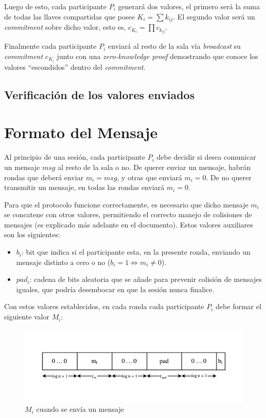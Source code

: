 Luego de esto, cada participante $P_i$ generará dos valores, el primero será 
la suma de todas las llaves compartidas que posee $K_i = \sum k_{ij}$. El 
segundo valor será un \emph{commitment} sobre dicho valor, esto es, 
$c_{K_i} = \prod c_{k_{ij}}$.

Finalmente cada participante $P_i$ enviará al resto de la sala vía 
\emph{broadcast} su \emph{commitment} $c_{K_i}$ junto con una 
\emph{zero-knowledge proof} demostrando que conoce los valores ``escondidos'' 
dentro del \emph{commitment}.

\subsection{Verificación de los valores enviados}


\section{Formato del Mensaje}

Al principio de una sesión, cada participante $P_i$ debe decidir si desea comunicar 
un mensaje $msg$ al resto de la sala o no. De querer enviar un mensaje, habrán 
rondas que deberá enviar $m_i = msg$, y otras que enviará $m_i = 0$. De no querer 
transmitir un mensaje, en todas las rondas enviará $m_i = 0$. 

Para que el protocolo funcione correctamente, es necesario que dicho mensaje $m_i$ 
se concatene con otros valores, permitiendo el correcto manejo de colisiones de 
mensajes (es explicado más adelante en el documento). Estos valores auxiliares son 
los siguientes:
\begin{itemize}
    \item $b_i$: bit que indica si el participante esta, en la presente ronda, 
    enviando un mensaje distinto a cero o no ($b_i = 1 \iff m_i \neq 0$).
    \item $pad_i$: cadena de bits aleatoria que se añade para prevenir colisión 
    de mensajes iguales, que podría desembocar en que la sesión nunca finalice.
\end{itemize}

Con estos valores establecidos, en cada ronda cada participante $P_i$ debe formar 
el siguiente valor $M_i$:

\begin{figure}
  \centering
    \includegraphics[width=1\textwidth]{imagenes/message-format(1).pdf}
  \caption{$M_i$ cuando se envía un mensaje}
\end{figure}

